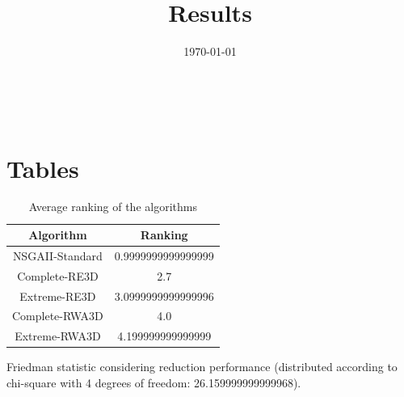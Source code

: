 \documentclass{article}
\title{Results}
\author{}
\date{\today}
\begin{document}
\oddsidemargin 0in \topmargin 0in\maketitle
\
\section{Tables}
\begin{table}[!htp]
\centering
\caption{Average ranking of the algorithms}
\begin{tabular}{c|c}
Algorithm&Ranking\\
\hline
NSGAII-Standard&0.9999999999999999\\
Complete-RE3D&2.7\\
Extreme-RE3D&3.0999999999999996\\
Complete-RWA3D&4.0\\
Extreme-RWA3D&4.199999999999999\\
\end{tabular}
\end{table}


Friedman statistic considering reduction performance (distributed according to chi-square with 4 degrees of freedom: 26.159999999999968).
\end{document}
